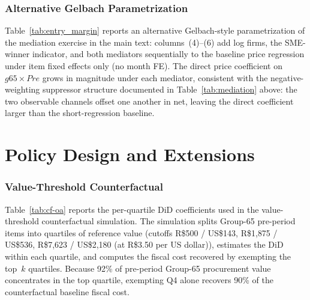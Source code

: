 \documentclass[12pt]{article}
\begin{document}

\section{Alternative Gelbach Parametrization}

Table~\ref{tab:entry_margin} reports an alternative Gelbach-style parametrization of the mediation exercise in the main text: columns~(4)--(6) add log firms, the SME-winner indicator, and both mediators sequentially to the baseline price regression under item fixed effects only (no month FE). The direct price coefficient on $g65\times Pre$ grows in magnitude under each mediator, consistent with the negative-weighting suppressor structure documented in Table~\ref{tab:mediation} above: the two observable channels offset one another in net, leaving the direct coefficient larger than the short-regression baseline.


\clearpage

\part{Policy Design and Extensions}

\section{Value-Threshold Counterfactual}

Table~\ref{tab:cf-oa} reports the per-quartile DiD coefficients used in the value-threshold counterfactual simulation. The simulation splits Group-65 pre-period items into quartiles of reference value (cutoffs R\$500 / US\$143, R\$1{,}875 / US\$536, R\$7{,}623 / US\$2{,}180 (at R\$3.50 per US dollar)), estimates the DiD within each quartile, and computes the fiscal cost recovered by exempting the top~$k$ quartiles. Because 92\% of pre-period Group-65 procurement value concentrates in the top quartile, exempting Q4 alone recovers 90\% of the counterfactual baseline fiscal cost.

\end{document}
